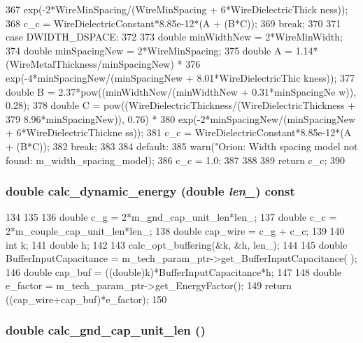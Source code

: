 \begin{DoxyCode}
{{{367                     exp(-2*WireMinSpacing/(WireMinSpacing + 6*WireDielectricThick
      ness));
368                 c_c = WireDielectricConstant*8.85e-12*(A + (B*C));
369                 break;
370             }
371         case DWIDTH_DSPACE:
372             {
373                 double minWidthNew = 2*WireMinWidth;
374                 double minSpacingNew = 2*WireMinSpacing;
375                 double A = 1.14*(WireMetalThickness/minSpacingNew) *
376                     exp(-4*minSpacingNew/(minSpacingNew + 8.01*WireDielectricThic
      kness));
377                 double B = 2.37*pow((minWidthNew/(minWidthNew + 0.31*minSpacingNe
      w)), 0.28);
378                 double C = pow((WireDielectricThickness/(WireDielectricThickness 
      +
379                                 8.96*minSpacingNew)), 0.76) *
380                     exp(-2*minSpacingNew/(minSpacingNew + 6*WireDielectricThickne
      ss));
381                 c_c = WireDielectricConstant*8.85e-12*(A + (B*C));
382                 break;
383             }
384         default:
385             warn("Orion: Width spacing model not found: %
      m_width_spacing_model);
386             c_c = 1.0;
387     }
388 
389     return c_c;
390 }
\end{DoxyCode}
\hypertarget{classWire_a30d13fb156057eaa4ca8fa32166b5f6b}{
\subsubsection[{calc\_\-dynamic\_\-energy}]{\setlength{\rightskip}{0pt plus 5cm}double calc\_\-dynamic\_\-energy (double {\em len\_\-}) const}}
\label{classWire_a30d13fb156057eaa4ca8fa32166b5f6b}



\begin{DoxyCode}
134 {
135 
136     double c_g = 2*m_gnd_cap_unit_len*len_;
137     double c_c = 2*m_couple_cap_unit_len*len_;
138     double cap_wire = c_g + c_c;
139 
140     int k;
141     double h;
142 
143     calc_opt_buffering(&k, &h, len_);
144 
145     double BufferInputCapacitance = m_tech_param_ptr->get_BufferInputCapacitance(
      );
146     double cap_buf = ((double)k)*BufferInputCapacitance*h;
147 
148     double e_factor = m_tech_param_ptr->get_EnergyFactor();
149     return ((cap_wire+cap_buf)*e_factor);
150 }
\end{DoxyCode}
\hypertarget{classWire_a9ef7d27c0caf3ac0b3d349ee0cd9440f}{
\subsubsection[{calc\_\-gnd\_\-cap\_\-unit\_\-len}]{\setlength{\rightskip}{0pt plus 5cm}double calc\_\-gnd\_\-cap\_\-unit\_\-len ()}}
\label{classWire_a9ef7d27c0caf3ac0b3d349ee0cd9440f}



